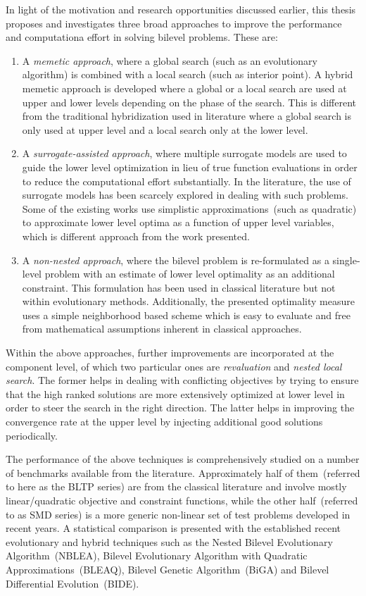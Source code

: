 In light of the motivation and research opportunities discussed earlier, this thesis proposes and investigates three broad approaches to improve the performance and computationa effort in solving bilevel problems. These are: 

\begin{enumerate}
\item A \emph{memetic approach}, where a global search (such as an evolutionary algorithm) is combined with a local search (such as interior point). A hybrid memetic approach is developed where a global or a local search are used at upper and lower levels depending on the phase of the search. This is different from the traditional hybridization used in literature where a global search is only used at upper level and a local search only at the lower level.  
\item A \emph{surrogate-assisted approach}, where multiple surrogate models are used to guide the lower level optimization in lieu of true function evaluations in order to reduce the computational effort substantially. In the literature, the use of surrogate models has been scarcely explored in dealing with such problems. Some of the existing works use simplistic approximations~(such as quadratic) to approximate lower level optima as a function of upper level variables, which is different approach from the work presented. 
\item A \emph{non-nested approach}, where the bilevel problem is re-formulated as a single-level problem with an estimate of lower level optimality as an additional constraint. This formulation has been used in classical literature but not within evolutionary methods. Additionally, the presented optimality measure uses a simple neighborhood based scheme which is easy to evaluate and free from mathematical assumptions inherent in classical approaches. 
\end{enumerate}

Within the above approaches, further improvements are incorporated at the component level, of which two particular ones are \emph{revaluation} and \emph{nested local search}. The former helps in dealing with conflicting objectives by trying to ensure that the high ranked solutions are more extensively optimized at lower level in order to steer the search in the right direction. The latter helps in improving the convergence rate at the upper level by injecting additional good solutions periodically. 

The performance of the above techniques is comprehensively studied on a number of benchmarks available from the literature. Approximately half of them~(referred to here as the BLTP series) are from the classical literature and involve mostly linear/quadratic objective and constraint functions, while the other half~(referred to as SMD series) is a more generic non-linear set of test problems developed in recent years. A statistical comparison is presented with the established recent evolutionary and hybrid techniques such as the Nested Bilevel Evolutionary Algorithm~(NBLEA), Bilevel Evolutionary Algorithm with Quadratic Approximations~(BLEAQ), Bilevel Genetic Algorithm~(BiGA) and Bilevel Differential Evolution~(BIDE).

